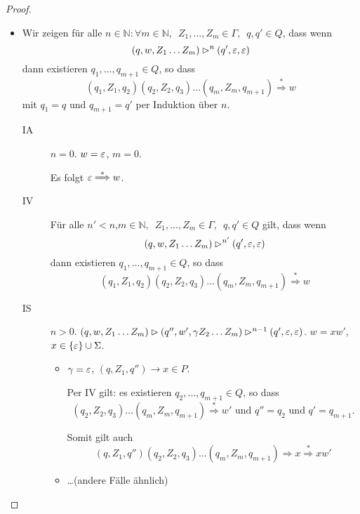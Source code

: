 {\begin{proof}
\begin{itemize}
\begin{itemize}
    \item Wir zeigen für alle $n \in \mathbb{N}: \forall m \in \mathbb{N},\enspace Z_1,\ldots,Z_m \in \Gamma,\enspace q,q' \in Q$, dass wenn
      \begin{displaymath}
        (q,w,Z_1\ldots Z_m) \rhd^n (q', \varepsilon, \varepsilon)
      \end{displaymath}
      dann existieren $q_1,\ldots,q_{m+1} \in Q$, so dass
      \begin{displaymath}
        (q_1,Z_1,q_2)(q_2,Z_2,q_3)\ldots(q_m,Z_m,q_{m+1}) \stackrel{*}{\Longrightarrow} w
      \end{displaymath}
      mit $q_1 = q$ und $q_{m+1} = q'$ per Induktion über $n$.

      \begin{description}
      \item[IA] $n = 0$.
        $w = \varepsilon$, $m = 0$.

        Es folgt $\varepsilon \stackrel{*}{\Longrightarrow} w$.
      \item[IV] Für alle $n' < n$,\enspace $m \in \mathbb{N},\enspace Z_1,\ldots,Z_m\in \Gamma,\enspace q,q' \in Q$ gilt, dass wenn
        \begin{displaymath}
        (q,w,Z_1\ldots Z_m) \rhd^{n'} (q', \varepsilon, \varepsilon)
      \end{displaymath}
      dann existieren $q_1,\ldots,q_{m+1} \in Q$, so dass
      \begin{displaymath}
        (q_1,Z_1,q_2)(q_2,Z_2,q_3)\ldots(q_m,Z_m,q_{m+1}) \stackrel{*}{\Longrightarrow} w
      \end{displaymath}

    \item[IS] $n > 0$.
      $(q, w, Z_1\ldots Z_m) \rhd (q'', w', \gamma Z_2\ldots Z_m) \rhd^{n-1} (q',\varepsilon, \varepsilon)$.
      $w =xw'$, \enspace $x \in \{\varepsilon\} \cup \Sigma$.
      \begin{itemize}
      \item $\gamma = \varepsilon$, \enspace $(q, Z_1, q'') \to x \in P$.

        Per IV gilt: es existieren $q_2,\ldots,q_{m+1} \in Q$, so dass
        \begin{displaymath}
          (q_2, Z_2, q_3)\ldots(q_m,Z_m,q_{m+1}) \stackrel{*}{\Longrightarrow} w' \text{ und } q''=q_2 \text{ und } q'=q_{m+1}.
        \end{displaymath}

        Somit gilt auch
        \begin{displaymath}
          (q, Z_1, q'') (q_2, Z_2, q_3)\ldots(q_m,Z_m,q_{m+1})\Longrightarrow x\stackrel{*}{\Longrightarrow} xw'
        \end{displaymath}
      \item \ldots (andere Fälle ähnlich)
      \end{itemize}
      \end{description}
  \end{itemize}
\end{itemize}
  

\end{proof}}
